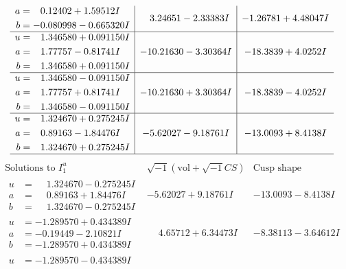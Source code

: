 \documentclass[1p]{elsarticle_modified}
\theoremstyle{definition}
\newcommand{\I}{\sqrt{-1}}
\begin{document}
$$\begin{array}{c|c|c}
\begin{aligned}
a &= \phantom{-}0.12402 + 1.59512 I \\
b &= -0.080998 - 0.665320 I\end{aligned}
 & \phantom{-}3.24651 - 2.33383 I & -1.26781 + 4.48047 I \\ \hline\begin{aligned}
u &= \phantom{-}1.346580 + 0.091150 I \\
a &= \phantom{-}1.77757 - 0.81741 I \\
b &= \phantom{-}1.346580 + 0.091150 I\end{aligned}
 & -10.21630 - 3.30364 I & -18.3839 + 4.0252 I \\ \hline\begin{aligned}
u &= \phantom{-}1.346580 - 0.091150 I \\
a &= \phantom{-}1.77757 + 0.81741 I \\
b &= \phantom{-}1.346580 - 0.091150 I\end{aligned}
 & -10.21630 + 3.30364 I & -18.3839 - 4.0252 I \\ \hline\begin{aligned}
u &= \phantom{-}1.324670 + 0.275245 I \\
a &= \phantom{-}0.89163 - 1.84476 I \\
b &= \phantom{-}1.324670 + 0.275245 I\end{aligned}
 & -5.62027 - 9.18761 I & -13.0093 + 8.4138 I\\
 \hline 
 \end{array}$$\newpage$$\begin{array}{c|c|c}  
\text{Solutions to }I^u_{1}& \I (\text{vol} + \sqrt{-1}CS) & \text{Cusp shape}\\
 \hline 
\begin{aligned}
u &= \phantom{-}1.324670 - 0.275245 I \\
a &= \phantom{-}0.89163 + 1.84476 I \\
b &= \phantom{-}1.324670 - 0.275245 I\end{aligned}
 & -5.62027 + 9.18761 I & -13.0093 - 8.4138 I \\ \hline\begin{aligned}
u &= -1.289570 + 0.434389 I \\
a &= -0.19449 - 2.10821 I \\
b &= -1.289570 + 0.434389 I\end{aligned}
 & \phantom{-}4.65712 + 6.34473 I & -8.38113 - 3.64612 I \\ \hline\begin{aligned}
u &= -1.289570 - 0.434389 I \\

\end{aligned}
\end{array}$$
\end{document}
